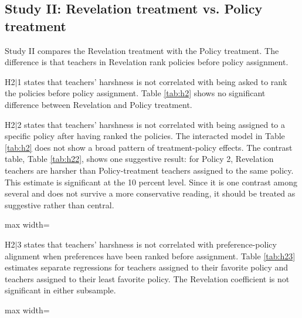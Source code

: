 \documentclass[12pt,a4paper]{article}
\newcommand{\tabpath}{../3. Output/tables/}
\begin{document}
\subsection{Study II: Revelation treatment vs. Policy treatment}

Study II compares the Revelation treatment with the Policy treatment. The difference is that teachers in Revelation rank policies before policy assignment.

H2\(|\)1 states that teachers' harshness is not correlated with being asked to rank the policies before policy assignment. Table \ref{tab:h2} shows no significant difference between Revelation and Policy treatment.

H2\(|\)2 states that teachers' harshness is not correlated with being assigned to a specific policy after having ranked the policies. The interacted model in Table \ref{tab:h2} does not show a broad pattern of treatment-policy effects. The contrast table, Table \ref{tab:h22}, shows one suggestive result: for Policy 2, Revelation teachers are harsher than Policy-treatment teachers assigned to the same policy. This estimate is significant at the 10 percent level. Since it is one contrast among several and does not survive a more conservative reading, it should be treated as suggestive rather than central.

\begin{table}[H]
	\centering
	\caption{Study II: H2\(|\)1 and H2\(|\)2}
	\label{tab:h2}
	\begin{adjustbox}{max width=\textwidth}
		
	\end{adjustbox}
\end{table}

\begin{table}[H]
	\centering
	\caption{Study II: H2\(|\)2 contrasts by assigned policy}
	\label{tab:h22}
	
\end{table}

H2\(|\)3 states that teachers' harshness is not correlated with preference-policy alignment when preferences have been ranked before assignment. Table \ref{tab:h23} estimates separate regressions for teachers assigned to their favorite policy and teachers assigned to their least favorite policy. The Revelation coefficient is not significant in either subsample.

\begin{table}[H]
	\centering
	\caption{Study II: H2\(|\)3}
	\label{tab:h23}
	\begin{adjustbox}{max width=\textwidth}
		
	\end{adjustbox}
\end{table}
\end{document}
